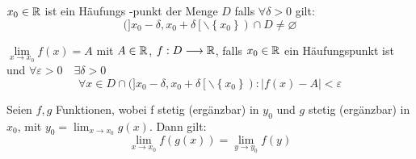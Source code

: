\Def[Häufungspunkt] $x_{0} \in \mathbb{R}$ ist ein Häufungs -punkt der Menge $D$ falls $\forall \delta>0$ gilt:
$$(]x_{0}-\delta, x_{0}+\delta\left[\backslash\left\{x_{0}\right\}\right) \cap D \neq \varnothing$$

\Def[Grenzwert] $\lim \limits_{x \rightarrow x_0} f(x) = A$ 
mit $A \in \mathbb{R}$, $f: D \longrightarrow \mathbb{R}$, falls $x_0 \in \mathbb{R}$ ein Häufungspunkt ist und $\forall \varepsilon>0 \quad \exists \delta>0$
$$\forall x \in D \cap(] x_{0}-\delta, x_{0}+\delta\left[\backslash\left\{x_{0}\right\}\right):|f(x)-A|<\varepsilon$$

\Satz[Variablenwechel] Seien $f, g$ Funktionen, wobei f stetig (ergänzbar) in $y_0$ und $g$ stetig (ergänzbar) in $x_0$, mit
$y_0 = \lim_{x \rightarrow x_0} g(x)$. Dann gilt:
$$
\lim _{x \rightarrow x_{0}} f(g(x))=\lim _{y \rightarrow y_{0}} f(y)
$$


